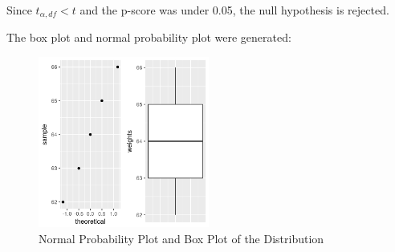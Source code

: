     Since $t_{\alpha, df} < t$ and the p-score was under 0.05, the null hypothesis is rejected.

    The box plot and normal probability plot were generated:

        \begin{figure}[ht]
            \begin{center}
                \includegraphics[width=0.5\textwidth]{figures/part3.png}
                \caption{Normal Probability Plot and Box Plot of the Distribution} \label{fig:part3}
            \end{center}
        \end{figure}
